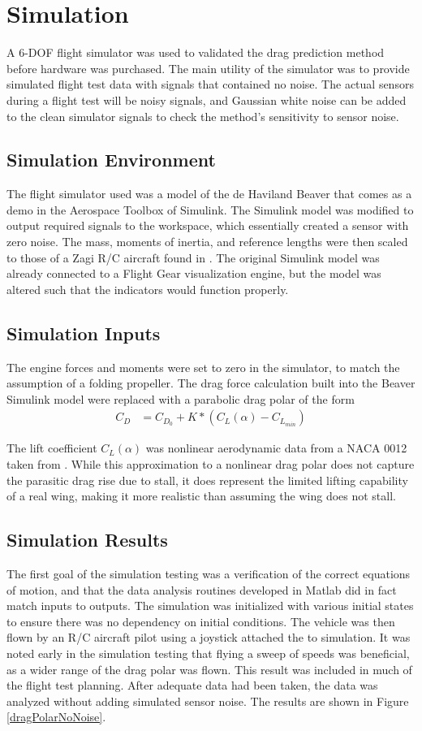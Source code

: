 \chapter{Simulation}
\label{simulation}
A 6-DOF flight simulator was used to validated the drag prediction method before hardware was purchased. The main utility of the simulator was to provide simulated flight test data with signals that contained no noise. The actual sensors during a flight test will be noisy signals, and Gaussian white noise can be added to the clean simulator signals to check the method's sensitivity to sensor noise.

\section{Simulation Environment}
The flight simulator used was a model of the de Haviland Beaver that comes as a demo in the Aerospace Toolbox of Simulink. The Simulink model was modified to output required signals to the workspace, which essentially created a sensor with zero noise. The mass, moments of inertia, and reference lengths were then scaled to those of a Zagi R/C aircraft found in \cite{stevens2003aircraft}. The original Simulink model was already connected to a Flight Gear visualization engine, but the model was altered such that the indicators would function properly.

\section{Simulation Inputs}
The engine forces and moments were set to zero in the simulator, to match the assumption of a folding propeller.
The drag force calculation built into the Beaver Simulink model were replaced with a parabolic drag polar of the form
\begin{align}
C_D &= C_{D_0} + K*(C_L(\alpha)-C_{L_{min}})
\end{align}

The lift coefficient $C_L(\alpha)$ was nonlinear aerodynamic data from a NACA 0012 taken from \cite{osborne2007transitions}. While this approximation to a nonlinear drag polar does not capture the parasitic drag rise due to stall, it does represent the limited lifting capability of a real wing, making it more realistic than assuming the wing does not stall.
\section{Simulation Results}
The first goal of the simulation testing was a verification of the correct equations of motion, and that the data analysis routines developed in Matlab did in fact match inputs to outputs. The simulation was initialized with various initial states to ensure there was no dependency on initial conditions. The vehicle was then flown by an R/C aircraft pilot using a joystick attached the to simulation. It was noted early in the simulation testing that flying a sweep of speeds was beneficial, as a wider range of the drag polar was flown. This result was included in much of the flight test planning. After adequate data had been taken, the data was analyzed without adding simulated sensor noise. The results are shown in Figure \ref{dragPolarNoNoise}.

